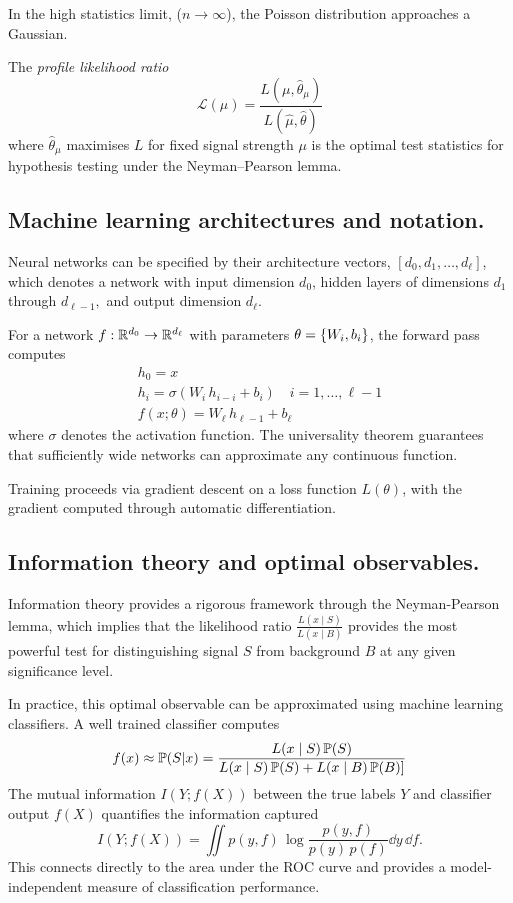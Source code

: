     In the high statistics limit, (\(n \to\infty\)), the Poisson distribution approaches a Gaussian.
    
    \begin{definition}
        The \emph{profile likelihood ratio}
            \[
                \mathcal L(\mu) = \frac{L(\mu, \hat\theta_\mu)}{ L(\hat\mu, \hat\theta)}
            \]
            where \(\hat\theta_\mu\) maximises \(L\) for fixed signal strength \(\mu\) is the optimal test statistics for hypothesis testing under the Neyman--Pearson lemma.

    \subsection{Machine learning architectures and notation.}
        Neural networks can be specified by their architecture vectors, \( [d_0, d_1,\dots, d_\ell]\), which denotes a network with input dimension \(d_0\), hidden layers of dimensions \(d_1\) through \(d_{\ell-1},\) and output dimension \(d_\ell\).

        For a network \(f: \R^{d_0} \to\R^{d_{\ell}}\) with parameters \(\theta = \qty{W_i, b_i}\), the forward pass computes
        \begin{gather}
            h_0 = x\\
            h_i = \sigma(W_i\,h_{i-i} + b_i)\quad i = 1,\dots, \ell-1\\
            f(x;\theta) = W_\ell\,h_{\ell - 1} + b_\ell
        \end{gather}
        where \(\sigma\) denotes the activation function. The universality theorem guarantees that sufficiently wide networks can approximate any continuous function.

        Training proceeds via gradient descent on a loss function \(L(\theta)\), with the gradient computed through automatic differentiation.
        
    \subsection{Information theory and optimal observables.}
        Information theory provides a rigorous framework through the Neyman-Pearson lemma, which implies that the likelihood ratio \(\frac{L(x\mid S)}{L(x\mid B)}\) provides the most powerful test for distinguishing signal \(S\) from background \(B\) at any given significance level.

        In practice, this optimal observable can be approximated using machine learning classifiers.
        A well trained classifier computes
        \[
            f(x) \approx \P(S|x) = \frac{L(x\mid S)\,\P(S)}{L(x\mid S)\,\P(S) + L(x\mid B)\, \P(B)]}
        \]
        The mutual information \(I(Y; f(X))\) between the true labels \(Y\) and classifier output \(f(X)\) quantifies the information captured
        \[
            I(Y; f(X)) = \iint p(y, f)\,\log \frac{p(y, f)}{p(y)\,p(f)} \dd y\, \dd f.
        \]
        This connects directly to the area under the ROC curve and provides a model-independent measure of classification performance.
        

\end{definition}

